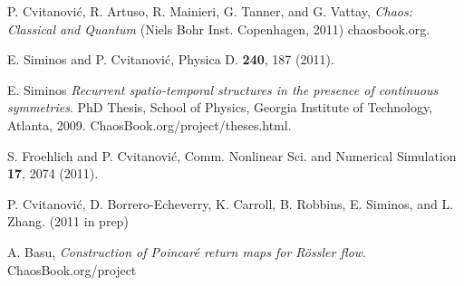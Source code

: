 \documentclass[12 pt]{article}
\begin{document}
\begin{thebibliography}{9}

 P. Cvitanovi\'c, R. Artuso, R. Mainieri, G. Tanner, and G. Vattay, \emph{Chaos: Classical and Quantum} (Niels Bohr Inst. Copenhagen, 2011)
    chaosbook.org.

 E. Siminos and P. Cvitanovi\'c, Physica D. {\bf 240}, 187 (2011).

 E. Siminos \emph{Recurrent spatio-temporal structures in the presence of continuous symmetries}. PhD Thesis, School of Physics, Georgia Institute of Technology, Atlanta, 2009.
    ChaosBook.org/project/theses.html.

 S. Froehlich and P. Cvitanovi\'c, Comm. Nonlinear Sci. and Numerical Simulation {\bf 17}, 2074 (2011).

 P. Cvitanovi\'c, D. Borrero-Echeverry, K. Carroll, B. Robbins, E. Siminos, and L. Zhang. (2011 in prep)

 A. Basu, \emph{Construction of Poincar\'e return maps for R\"ossler flow}.
    ChaosBook.org/project


\end{thebibliography}
\end{document}
